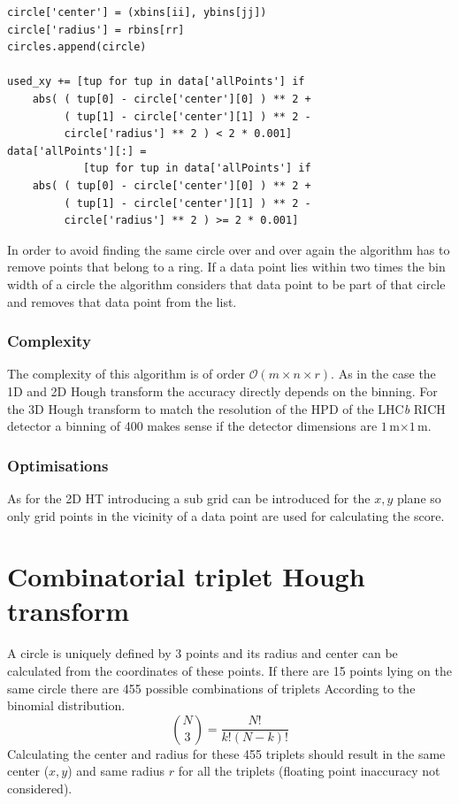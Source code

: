 \documentclass[11pt,twoside]{scrreprt}
\begin{document}
\begin{codesnippet}[htbp]
\begin{lstlisting}
circle['center'] = (xbins[ii], ybins[jj])
circle['radius'] = rbins[rr]
circles.append(circle)

used_xy += [tup for tup in data['allPoints'] if
    abs( ( tup[0] - circle['center'][0] ) ** 2 +
         ( tup[1] - circle['center'][1] ) ** 2 -
         circle['radius'] ** 2 ) < 2 * 0.001]
data['allPoints'][:] = 
            [tup for tup in data['allPoints'] if 
    abs( ( tup[0] - circle['center'][0] ) ** 2 + 
         ( tup[1] - circle['center'][1] ) ** 2 - 
         circle['radius'] ** 2 ) >= 2 * 0.001]  
\end{lstlisting}
\caption[Remove used points]{In order to avoid finding the same circle over and over again the algorithm has to remove points that
belong to a ring. If a data point lies within two times the bin width of a circle the algorithm considers that data point to be 
part of that circle and removes that data point from the list.}
\label{pc:remove_points}
\end{codesnippet}

\subsubsection{Complexity} %
\label{ssub:complexity}
The complexity of this algorithm is of order $\mathcal{O}(m\times n\times r)$. As in the case the 1D and 2D Hough transform the accuracy
directly depends on the binning. For the 3D Hough transform to match the resolution of the HPD of the LHC\textit{b} RICH detector a binning 
of 400 makes sense if the detector dimensions are $1$\,m$\times1$\,m.

\subsubsection{Optimisations} %
\label{ssub:optimisations}
As for the 2D HT introducing a sub grid can be introduced for the $x,y$ plane so only grid points in the vicinity of a data point are used
for calculating the score.
\clearpage

\section{Combinatorial triplet Hough transform}
\label{sec:combinatorial_approach}
A circle is uniquely defined by 3 points and its radius and center can be calculated from the coordinates of these points. If there are 
15 points lying on the same circle there are 455 possible combinations of triplets According to the binomial distribution.
\[
   \binom{N}{3} = \frac{N!}{k!(N-k)!}
 \] 
Calculating the center and radius for these 455 triplets should result in the same center ($x,y$) and same radius $r$ for all the triplets 
(floating point inaccuracy not considered). 
\end{document}
